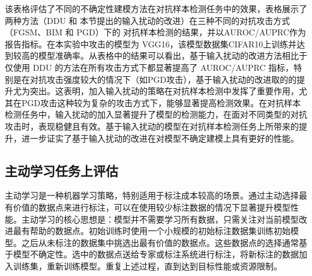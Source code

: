 \begin{table}[h]
\captionsetup{font=small, justification=centering}
        \captionsetup{font=small, justification=centering}
	\centering
        \renewcommand{\arraystretch}{1.0} %
	\caption{在CIFAR10数据集上训练VGG16模型,使用FGSM、BIM、PGD生成对抗样本，在对抗样本检测任务评估模型不确定性的建模效果，报告指标是AUROC($\uparrow$) / AUPRC($\uparrow$)}
        \label{tag:adv detection}
\end{table}



该表格评估了不同的不确定性建模方法在对抗样本检测任务中的效果，表格展示了两种方法（DDU 和 本节提出的输入扰动的改进）在三种不同的对抗攻击方式（FGSM、BIM 和 PGD）下的 对抗样本检测的结果，并以AUROC/AUPRC作为报告指标。在本实验中攻击的模型为 VGG16，该模型数据集CIFAR10上训练并达到较高的模型准确率。从表格中的结果可以看出，基于输入扰动的改进方法相比于仅使用 DDU 的方法在所有攻击方式下都显著提高了 AUROC/AUPRC 指标，特别是在对抗攻击强度较大的情况下（如PGD攻击），基于输入扰动的改进取的的提升尤为突出。这表明，加入输入扰动的策略在对抗样本检测中发挥了重要作用，尤其在PGD攻击这种较为复杂的攻击方式下，能够显著提高检测效果。在对抗样本检测任务中，输入扰动的加入显著提升了模型的检测能力，在面对不同类型的对抗攻击时，表现稳健且有效。基于输入扰动的模型在对抗样本检测任务上所带来的提升，进一步证实了基于输入扰动的改进在对模型不确定建模上具有更好的性能。
\subsection{主动学习任务上评估}
主动学习是一种机器学习策略，特别适用于标注成本较高的场景。通过主动选择最有价值的数据点来进行标注，可以在使用较少标注数据的情况下显著提升模型性能。主动学习的核心思想是：模型并不需要学习所有数据，只需关注对当前模型改进最有帮助的数据点。初始训练时使用一个小规模的初始标注数据集训练初始模型。之后从未标注的数据集中挑选出最有价值的数据点。这些数据点的选择通常基于模型不确定性。选中的数据点送给专家或标注系统进行标注，将新标注的数据加入训练集，重新训练模型。重复上述过程，直到达到目标性能或资源限制。

